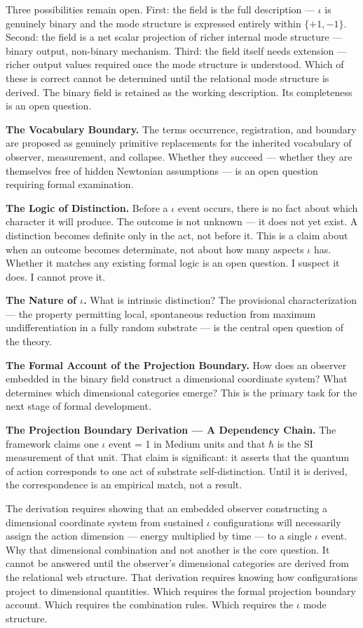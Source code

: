 \documentclass[11pt,letterpaper]{article}
\begin{document}
Three possibilities remain open. First: the field is the full description --- \(\iota\) is genuinely binary and the mode structure is expressed entirely within \(\{+1,-1\}\). Second: the field is a net scalar projection of richer internal mode structure --- binary output, non-binary mechanism. Third: the field itself needs extension --- richer output values required once the mode structure is understood. Which of these is correct cannot be determined until the relational mode structure is derived. The binary field is retained as the working description. Its completeness is an open question.

\textbf{The Vocabulary Boundary.} The terms occurrence, registration, and boundary are proposed as genuinely primitive replacements for the inherited vocabulary of observer, measurement, and collapse. Whether they succeed --- whether they are themselves free of hidden Newtonian assumptions --- is an open question requiring formal examination.

\textbf{The Logic of Distinction.} Before a \(\iota\) event occurs, there is no fact about which character it will produce. The outcome is not unknown --- it does not yet exist. A distinction becomes definite only in the act, not before it. This is a claim about when an outcome becomes determinate, not about how many aspects \(\iota\) has. Whether it matches any existing formal logic is an open question. I suspect it does. I cannot prove it.

\textbf{The Nature of \(\iota\).} What is intrinsic distinction? The provisional characterization --- the property permitting local, spontaneous reduction from maximum undifferentiation in a fully random substrate --- is the central open question of the theory.

\textbf{The Formal Account of the Projection Boundary.} How does an observer embedded in the binary field construct a dimensional coordinate system? What determines which dimensional categories emerge? This is the primary task for the next stage of formal development.

\textbf{The Projection Boundary Derivation --- A Dependency Chain.} The framework claims one \(\iota\) event = 1 in Medium units and that \(\hbar\) is the SI measurement of that unit. That claim is significant: it asserts that the quantum of action corresponds to one act of substrate self-distinction. Until it is derived, the correspondence is an empirical match, not a result.

The derivation requires showing that an embedded observer constructing a dimensional coordinate system from sustained \(\iota\) configurations will necessarily assign the action dimension --- energy multiplied by time --- to a single \(\iota\) event. Why that dimensional combination and not another is the core question. It cannot be answered until the observer's dimensional categories are derived from the relational web structure. That derivation requires knowing how configurations project to dimensional quantities. Which requires the formal projection boundary account. Which requires the combination rules. Which requires the \(\iota\) mode structure.
\end{document}
